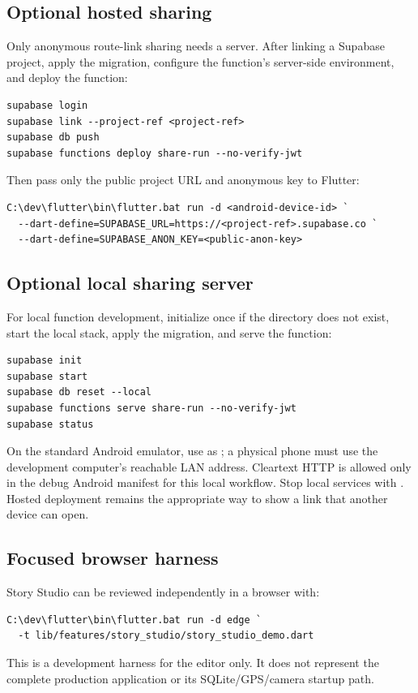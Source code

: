 \subsection{Optional hosted sharing}
Only anonymous route-link sharing needs a server. After linking a Supabase
project, apply the migration, configure the function's server-side environment,
and deploy the function:
\begin{verbatim}
supabase login
supabase link --project-ref <project-ref>
supabase db push
supabase functions deploy share-run --no-verify-jwt
\end{verbatim}

Then pass only the public project URL and anonymous key to Flutter:
\begin{verbatim}
C:\dev\flutter\bin\flutter.bat run -d <android-device-id> `
  --dart-define=SUPABASE_URL=https://<project-ref>.supabase.co `
  --dart-define=SUPABASE_ANON_KEY=<public-anon-key>
\end{verbatim}

\subsection{Optional local sharing server}
For local function development, initialize once if the  directory
does not exist, start the local stack, apply the migration, and serve the
function:
\begin{verbatim}
supabase init
supabase start
supabase db reset --local
supabase functions serve share-run --no-verify-jwt
supabase status
\end{verbatim}

On the standard Android emulator, use
 as ; a physical phone must use the
development computer's reachable LAN address. Cleartext HTTP is allowed only in
the debug Android manifest for this local workflow. Stop local services with
. Hosted deployment remains the appropriate way to show a
link that another device can open.

\subsection{Focused browser harness}
Story Studio can be reviewed independently in a browser with:
\begin{verbatim}
C:\dev\flutter\bin\flutter.bat run -d edge `
  -t lib/features/story_studio/story_studio_demo.dart
\end{verbatim}
This is a development harness for the editor only. It does not represent the
complete production application or its SQLite/GPS/camera startup path.
